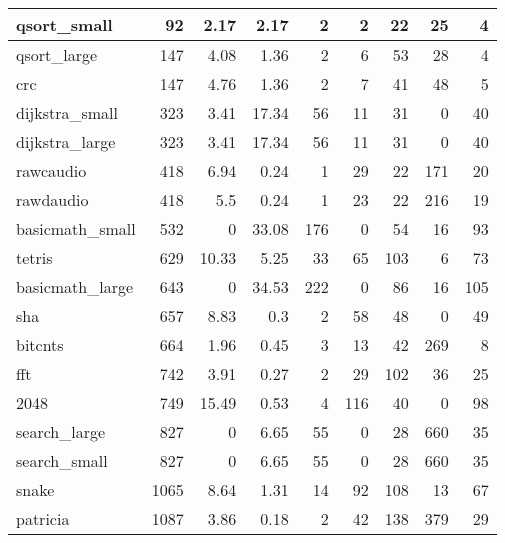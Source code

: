 \begin{tabular}{l|r|r|r|r|r|r|r|r}
\hline
 qsort\_small     &             92 &     2.17 &   2.17 &    2 &      2 &           22 &    25 &     4 \\
\hline
 qsort\_large     &            147 &     4.08 &   1.36 &    2 &      6 &           53 &    28 &     4 \\
\hline
 crc             &            147 &     4.76 &   1.36 &    2 &      7 &           41 &    48 &     5 \\
\hline
 dijkstra\_small  &            323 &     3.41 &  17.34 &   56 &     11 &           31 &     0 &    40 \\
\hline
 dijkstra\_large  &            323 &     3.41 &  17.34 &   56 &     11 &           31 &     0 &    40 \\
\hline
 rawcaudio       &            418 &     6.94 &   0.24 &    1 &     29 &           22 &   171 &    20 \\
\hline
 rawdaudio       &            418 &     5.5  &   0.24 &    1 &     23 &           22 &   216 &    19 \\
\hline
 basicmath\_small &            532 &     0    &  33.08 &  176 &      0 &           54 &    16 &    93 \\
\hline
 tetris          &            629 &    10.33 &   5.25 &   33 &     65 &          103 &     6 &    73 \\
\hline
 basicmath\_large &            643 &     0    &  34.53 &  222 &      0 &           86 &    16 &   105 \\
\hline
 sha             &            657 &     8.83 &   0.3  &    2 &     58 &           48 &     0 &    49 \\
\hline
 bitcnts         &            664 &     1.96 &   0.45 &    3 &     13 &           42 &   269 &     8 \\
\hline
 fft             &            742 &     3.91 &   0.27 &    2 &     29 &          102 &    36 &    25 \\
\hline
 2048            &            749 &    15.49 &   0.53 &    4 &    116 &           40 &     0 &    98 \\
\hline
 search\_large    &            827 &     0    &   6.65 &   55 &      0 &           28 &   660 &    35 \\
\hline
 search\_small    &            827 &     0    &   6.65 &   55 &      0 &           28 &   660 &    35 \\
\hline
 snake           &           1065 &     8.64 &   1.31 &   14 &     92 &          108 &    13 &    67 \\
\hline
 patricia        &           1087 &     3.86 &   0.18 &    2 &     42 &          138 &   379 &    29 \\

\end{tabular}
